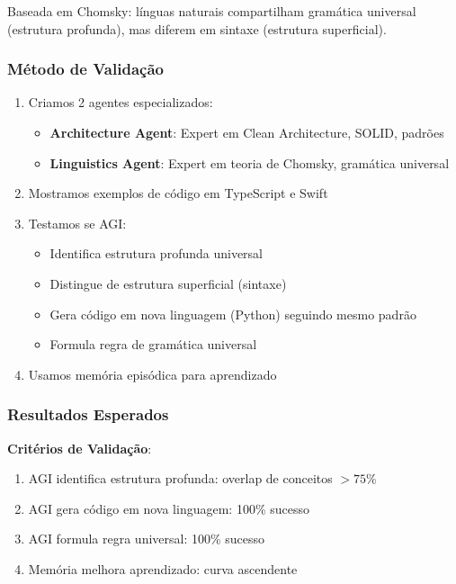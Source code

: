 \documentclass[11pt]{article}
\begin{document}
Baseada em Chomsky: línguas naturais compartilham gramática universal (estrutura profunda), mas diferem em sintaxe (estrutura superficial).

\subsubsection{Método de Validação}

\begin{enumerate}
    \item Criamos 2 agentes especializados:
    \begin{itemize}
        \item \textbf{Architecture Agent}: Expert em Clean Architecture, SOLID, padrões
        \item \textbf{Linguistics Agent}: Expert em teoria de Chomsky, gramática universal
    \end{itemize}

    \item Mostramos exemplos de código em TypeScript e Swift

    \item Testamos se AGI:
    \begin{itemize}
        \item Identifica estrutura profunda universal
        \item Distingue de estrutura superficial (sintaxe)
        \item Gera código em nova linguagem (Python) seguindo mesmo padrão
        \item Formula regra de gramática universal
    \end{itemize}

    \item Usamos memória episódica para aprendizado
\end{enumerate}

\subsubsection{Resultados Esperados}

\textbf{Critérios de Validação}:
\begin{enumerate}
    \item AGI identifica estrutura profunda: overlap de conceitos $> 75\%$
    \item AGI gera código em nova linguagem: 100\% sucesso
    \item AGI formula regra universal: 100\% sucesso
    \item Memória melhora aprendizado: curva ascendente
\end{enumerate}
\end{document}
